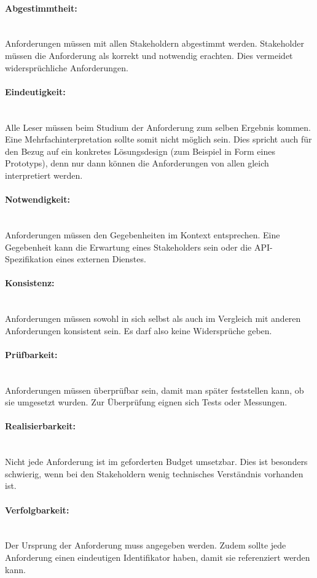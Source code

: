 \documentclass[a4paper, ngerman, 12pt, usenames, dvipsnames]{article}
\begin{document}
\paragraph{Abgestimmtheit:}\mbox{} \\
Anforderungen müssen mit allen Stakeholdern abgestimmt werden.
Stakeholder müssen die Anforderung als korrekt und notwendig erachten.
Dies vermeidet widersprüchliche Anforderungen.
\paragraph{Eindeutigkeit:}\mbox{} \\
Alle Leser müssen beim Studium der Anforderung zum selben Ergebnis kommen. 
Eine Mehrfachinterpretation sollte somit nicht möglich sein.
Dies spricht auch für den Bezug auf ein konkretes Lösungsdesign (zum Beispiel in Form eines Prototyps), denn nur dann können die Anforderungen von allen gleich interpretiert werden.
\paragraph{Notwendigkeit:}\mbox{} \\
Anforderungen müssen den Gegebenheiten im Kontext entsprechen. 
Eine Gegebenheit kann die Erwartung eines Stakeholders sein oder die API-Spezifikation eines externen Dienstes.
\paragraph{Konsistenz:}\mbox{} \\
Anforderungen müssen sowohl in sich selbst als auch im Vergleich mit anderen Anforderungen konsistent sein. 
Es darf also keine Widersprüche geben.
\paragraph{Prüfbarkeit:}\mbox{} \\
Anforderungen müssen überprüfbar sein, damit man später feststellen kann, ob sie umgesetzt wurden. 
Zur Überprüfung eignen sich Tests oder Messungen.
\paragraph{Realisierbarkeit:}\mbox{} \\
Nicht jede Anforderung ist im geforderten Budget umsetzbar. 
Dies ist besonders schwierig, wenn bei den Stakeholdern wenig technisches Verständnis vorhanden ist.
\paragraph{Verfolgbarkeit:}\mbox{} \\
Der Ursprung der Anforderung muss angegeben werden. 
Zudem sollte jede Anforderung einen eindeutigen Identifikator haben, damit sie referenziert werden kann.
\end{document}
